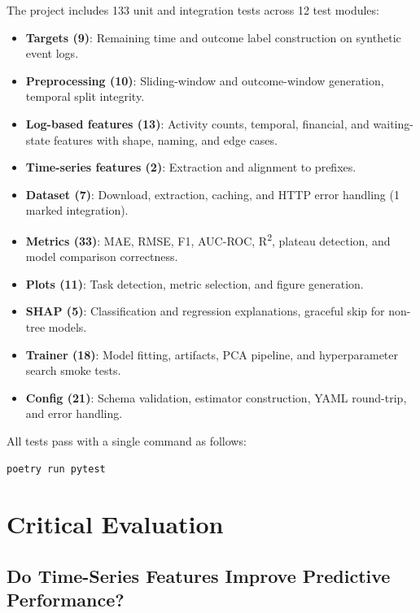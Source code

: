 \documentclass[runningheads]{llncs}
\begin{document}
The project includes 133 unit and integration tests across 12
test modules:
\begin{itemize}
    \item \textbf{Targets (9)}: Remaining time and outcome label
          construction on synthetic event logs.
    \item \textbf{Preprocessing (10)}: Sliding-window and
          outcome-window generation, temporal split integrity.
    \item \textbf{Log-based features (13)}: Activity counts,
          temporal, financial, and waiting-state features
          with shape, naming, and edge cases.
    \item \textbf{Time-series features (2)}: Extraction and
          alignment to prefixes.
    \item \textbf{Dataset (7)}: Download, extraction, caching,
          and HTTP error handling (1 marked integration).
    \item \textbf{Metrics (33)}: MAE, RMSE, F1, AUC-ROC,
          R\textsuperscript{2}, plateau detection, and model
          comparison correctness.
    \item \textbf{Plots (11)}: Task detection, metric selection,
          and figure generation.
    \item \textbf{SHAP (5)}: Classification and regression
          explanations, graceful skip for non-tree models.
    \item \textbf{Trainer (18)}: Model fitting, artifacts,
          PCA pipeline, and hyperparameter search smoke tests.
    \item \textbf{Config (21)}: Schema validation, estimator
          construction, YAML round-trip, and error handling.
\end{itemize}
All tests pass with a single command as follows:
\begin{verbatim}
poetry run pytest
\end{verbatim}

\section{Critical Evaluation}
\label{sec:evaluation}

\subsection{Do Time-Series Features Improve Predictive Performance?}
\label{sec:discussion-value}
\end{document}

